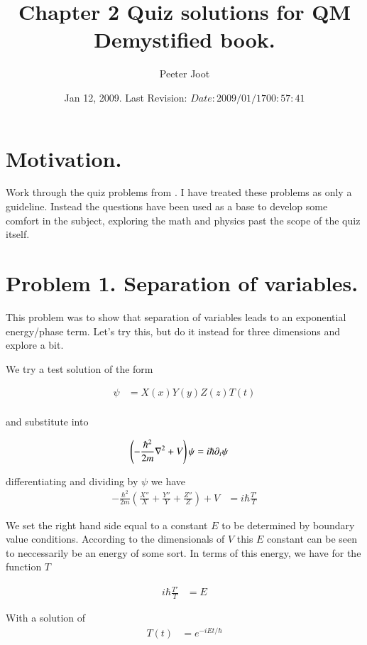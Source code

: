 \documentclass{article}
\title{ Chapter 2 Quiz solutions for QM Demystified book. }
\author{Peeter Joot}
\date{ Jan 12, 2009.  Last Revision: $Date: 2009/01/17 00:57:41 $ }
\begin{document}
\maketitle{}
\tableofcontents
\section{ Motivation. }

Work through the quiz problems from \cite{mcmahon2005qmd}.  I have treated these problems as only a guideline.  Instead the questions have been used as a
base to develop some comfort in the subject, exploring the math and physics past the scope of the quiz itself.

\section{ Problem 1. Separation of variables. }

This problem was to show that separation of variables leads to an exponential energy/phase
term.  Let's try this, but do it instead for three dimensions and explore a bit.

We try a test solution of the form

\begin{align*}
\psi &= X(x) Y(y) Z(z) T(t) \\
\end{align*}

and substitute into 

\begin{align*}
\left(-\frac{\hbar^2}{2m}\nabla^2 + V\right) \psi &= i \hbar \partial_t \psi
\end{align*}

differentiating and dividing by $\psi$ we have
\begin{align*}
-\frac{\hbar^2}{2m}
\left(
\frac{X''}{X}
+\frac{Y''}{Y}
+\frac{Z''}{Z}
\right)
 + V &= i \hbar \frac{T'}{T}
\end{align*}

We set the right hand side equal to a constant $E$ to be determined by boundary value conditions.
According to the dimensionals of $V$ this $E$ constant can be seen to neccessarily be an energy
of some sort.  In terms of this energy, we have for the function $T$

\begin{align*}
i \hbar \frac{T'}{T} &= E
\end{align*}

With a solution of
\begin{align*}
T(t) &= e^{-i E t/\hbar}
\end{align*}
\end{document}
